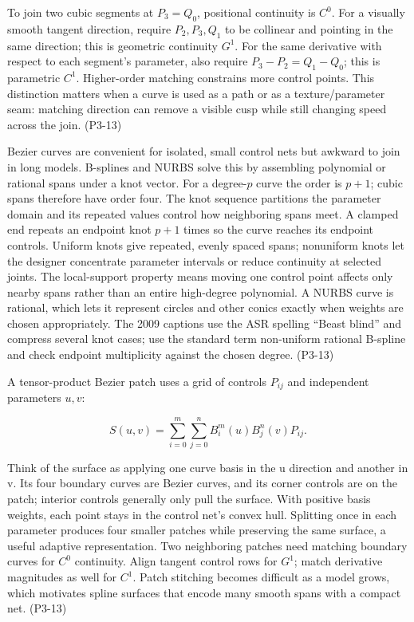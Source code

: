 To join two cubic segments at \(P_3=Q_0\), positional continuity is \(C^0\). For a visually smooth tangent direction, require \(P_2,P_3,Q_1\) to be collinear and pointing in the same direction; this is geometric continuity \(G^1\). For the same derivative with respect to each segment's parameter, also require \(P_3-P_2=Q_1-Q_0\); this is parametric \(C^1\). Higher-order matching constrains more control points. This distinction matters when a curve is used as a path or as a texture/parameter seam: matching direction can remove a visible cusp while still changing speed across the join. (P3-13)

Bezier curves are convenient for isolated, small control nets but awkward to join in long models. B-splines and NURBS solve this by assembling polynomial or rational spans under a knot vector. For a degree-\(p\) curve the order is \(p+1\); cubic spans therefore have order four. The knot sequence partitions the parameter domain and its repeated values control how neighboring spans meet. A clamped end repeats an endpoint knot \(p+1\) times so the curve reaches its endpoint controls. Uniform knots give repeated, evenly spaced spans; nonuniform knots let the designer concentrate parameter intervals or reduce continuity at selected joints. The local-support property means moving one control point affects only nearby spans rather than an entire high-degree polynomial. A NURBS curve is rational, which lets it represent circles and other conics exactly when weights are chosen appropriately. The 2009 captions use the ASR spelling ``Beast blind'' and compress several knot cases; use the standard term non-uniform rational B-spline and check endpoint multiplicity against the chosen degree. (P3-13)

A tensor-product Bezier patch uses a grid of controls \(P_{ij}\) and independent parameters \(u,v\):

\[
S(u,v)=\sum_{i=0}^{m}\sum_{j=0}^{n}B_i^m(u)B_j^n(v)P_{ij}.
\]

Think of the surface as applying one curve basis in the u direction and another in v. Its four boundary curves are Bezier curves, and its corner controls are on the patch; interior controls generally only pull the surface. With positive basis weights, each point stays in the control net's convex hull. Splitting once in each parameter produces four smaller patches while preserving the same surface, a useful adaptive representation. Two neighboring patches need matching boundary curves for \(C^0\) continuity. Align tangent control rows for \(G^1\); match derivative magnitudes as well for \(C^1\). Patch stitching becomes difficult as a model grows, which motivates spline surfaces that encode many smooth spans with a compact net. (P3-13)

